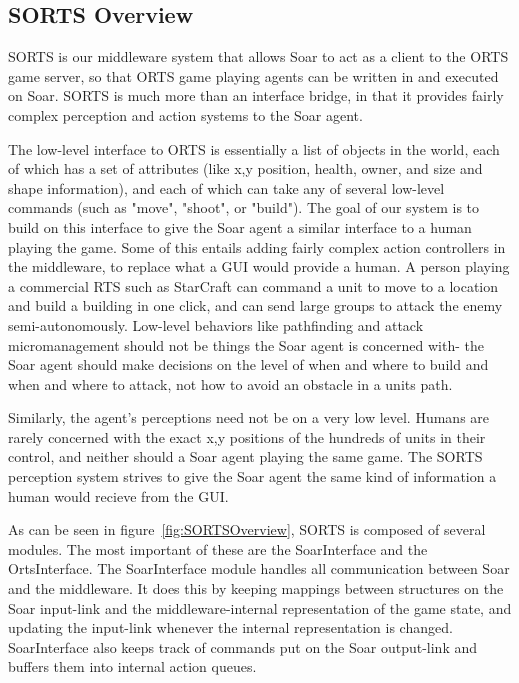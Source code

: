 \documentclass{article}
\begin{document}
\subsection{SORTS Overview}

SORTS is our middleware system that allows Soar to act as a client to
the ORTS game server, so that ORTS game playing agents can be written
in and executed on Soar. SORTS is much more than an interface bridge,
in that it provides fairly complex perception and action systems to the
Soar agent.

The low-level interface to ORTS is essentially a list of objects in the
world, each of which has a set of attributes (like x,y position, health,
owner, and size and shape information), and each of which can take any
of several low-level commands (such as "move", "shoot", or "build"). The
goal of our system is to build on this interface to give the Soar agent
a similar interface to a human playing the game. Some of this entails
adding fairly complex action controllers in the middleware, to replace
what a GUI would provide a human. A person playing a commercial RTS
such as StarCraft can command a unit to move to a location and build a
building in one click, and can send large groups to attack the enemy
semi-autonomously. Low-level behaviors like pathfinding and attack
micromanagement should not be things the Soar agent is concerned with-
the Soar agent should make decisions on the level of when and where to
build and when and where to attack, not how to avoid an obstacle in a
units path.

Similarly, the agent's perceptions need not be on a very low level.
Humans are rarely concerned with the exact x,y positions of the hundreds
of units in their control, and neither should a Soar agent playing the
same game. The SORTS perception system strives to give the Soar agent
the same kind of information a human would recieve from the GUI.

As can be seen in figure~\ref{fig:SORTSOverview}, SORTS is composed of
several modules. The most important of these are the SoarInterface and
the OrtsInterface. The SoarInterface module handles all communication
between Soar and the middleware. It does this by keeping mappings
between structures on the Soar input-link and the middleware-internal
representation of the game state, and updating the input-link whenever
the internal representation is changed. SoarInterface also keeps track
of commands put on the Soar output-link and buffers them into internal
action queues.
\end{document}
